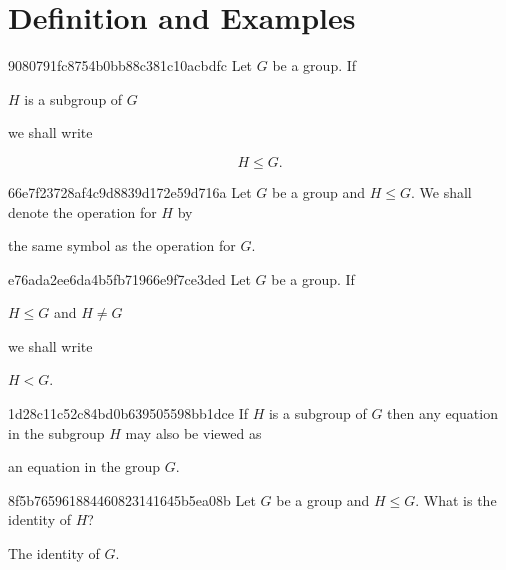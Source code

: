 


\section{Definition and Examples}
\begin{note}{9080791fc8754b0bb88c381c10acbdfc}
    Let \({ G }\) be a group.
    If \begin{icloze}{2}\({ H }\) is a subgroup of \({ G }\)\end{icloze} we shall write
    \begin{icloze}{1}
        \[
            H \leq G.
        \]
    \end{icloze}
\end{note}

\begin{note}{66e7f23728af4c9d8839d172e59d716a}
    Let \({ G }\) be a group and \({ H \leq G }\).
    We shall denote the operation for \({ H }\) by \begin{icloze}{1}the same symbol as the operation for \({ G }\).\end{icloze}
\end{note}

\begin{note}{e76ada2ee6da4b5fb71966e9f7ce3ded}
    Let \({ G }\) be a group.
    If \begin{icloze}{2}\({ H \leq G }\) and \({ H \neq G }\)\end{icloze} we shall write \begin{icloze}{1}\({ H < G }\).\end{icloze}
\end{note}

\begin{note}{1d28c11c52c84bd0b639505598bb1dce}
    If \({ H }\) is a subgroup of \({ G }\) then any equation in the subgroup \({ H }\) may also be viewed as \begin{icloze}{1}an equation in the group \({ G }\).\end{icloze}
\end{note}

\begin{note}{8f5b765961884460823141645b5ea08b}
    Let \({ G }\) be a group and \({ H \leq G }\).
    What is the identity of \({ H }\)?

    \begin{cloze}{1}
        The identity of \({ G }\).
    \end{cloze}
\end{note}


